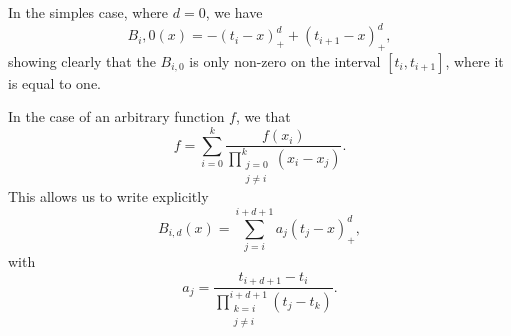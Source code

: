 In the simples case, where $d = 0$, we have
\begin{equation}
    B_i,0(x) = -(t_i - x)_+^d + (t_{i + 1} - x)_+^d,
\end{equation}
showing clearly that the $B_{i, 0}$ is only non-zero on the interval $[t_i, t_{i + 1}]$, where it is equal to one.

In the case of an arbitrary function $f$, we that
\begin{equation}
    [x_0, x_1, \dots, x_{k}]f
    = \sum_{i = 0}^{k} \frac{
        f(x_i)
    }{
        \prod_{\substack{j = 0 \\ j \neq i}}^{k} (x_i - x_j)
    }.
\end{equation}
This allows us to write explicitly
\begin{equation}
    B_{i, d}(x) = \sum_{j = i}^{i + d + 1} a_j (t_j - x)_+^d,
\end{equation}
with
\begin{equation}
    a_j = \frac{t_{i + d + 1} - t_i}{\prod_{\substack{k = i \\ j \neq i}}^{i + d + 1} (t_j - t_k)}.
\end{equation}